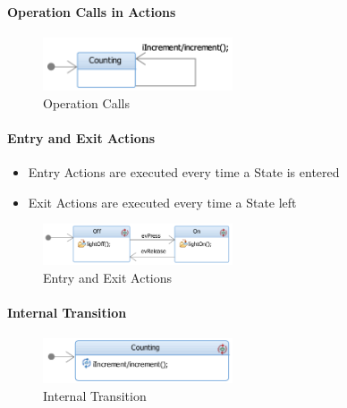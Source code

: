 \hypertarget{operation-calls-in-actions}{%
\paragraph{Operation Calls in
Actions}\label{operation-calls-in-actions}}

\begin{figure}[H]
\centering
\includegraphics[width=0.5\textwidth]{figures/fsmOperationCall.png}
\caption{Operation Calls}
\end{figure}

\clearpage
\hypertarget{entry-and-exit-actions}{%
\paragraph{Entry and Exit Actions}\label{entry-and-exit-actions}}

\begin{itemize}
\tightlist
\item
  Entry Actions are executed every time a State is entered
\item
  Exit Actions are executed every time a State left
\end{itemize}

\begin{figure}[H]
\centering
\includegraphics[width=0.5\textwidth]{figures/fsmEntryExitAction.png}
\caption{Entry and Exit Actions}
\end{figure}

\hypertarget{internal-transition}{%
\paragraph{Internal Transition}\label{internal-transition}}

\begin{figure}[H]
\centering
\includegraphics[width=0.5\textwidth]{figures/fsmInternalTransition.png}
\caption{Internal Transition}
\end{figure}

